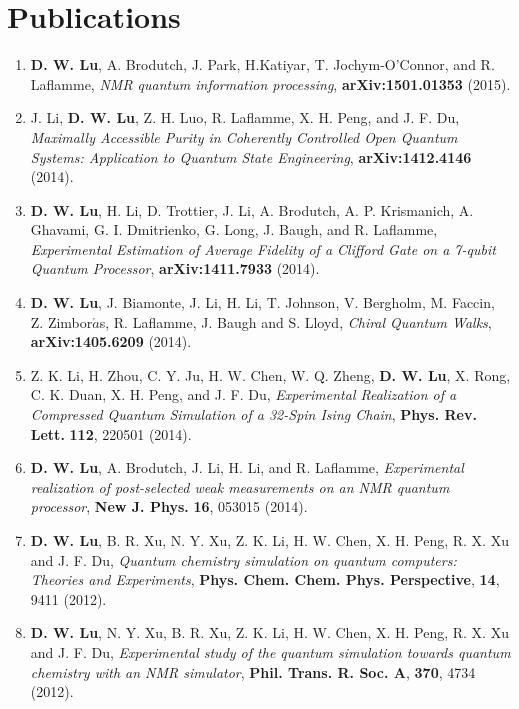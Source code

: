 \documentclass[a4paper,10pt]{article}
\begin{document}
\section{Publications}
\medskip
\begin{enumerate}
\item \textbf{D. W. Lu}, A. Brodutch, J. Park, H.Katiyar, T. Jochym-O'Connor, and R. Laflamme, {\it NMR quantum information processing},  {\bf arXiv:1501.01353} (2015).
    
\item J. Li, \textbf{D. W. Lu}, Z. H. Luo, R. Laflamme, X. H. Peng, and J. F. Du, {\it Maximally Accessible Purity in Coherently Controlled Open Quantum Systems: Application to Quantum State Engineering},  {\bf arXiv:1412.4146} (2014).

\item \textbf{D. W. Lu}, H. Li, D. Trottier, J. Li, A. Brodutch, A. P. Krismanich, A. Ghavami, G. I. Dmitrienko, G. Long, J. Baugh, and R. Laflamme, {\it Experimental Estimation of Average Fidelity of a Clifford Gate on a 7-qubit Quantum Processor},  {\bf arXiv:1411.7933} (2014).

\item \textbf{D. W. Lu}, J. Biamonte, J. Li, H. Li, T. Johnson, V. Bergholm, M. Faccin, Z. Zimbor$\acute{a}$s, R. Laflamme, J. Baugh and S. Lloyd, {\it Chiral Quantum Walks},  {\bf arXiv:1405.6209} (2014).

\item Z. K. Li, H. Zhou, C. Y. Ju, H. W. Chen, W. Q. Zheng, \textbf{D. W. Lu}, X. Rong, C. K. Duan, X. H. Peng, and J. F. Du, {\it Experimental Realization of a Compressed Quantum Simulation of a 32-Spin Ising Chain}, {\bf Phys. Rev. Lett.} \textbf{112}, 220501 (2014).

\item \textbf{D. W. Lu}, A. Brodutch, J. Li, H. Li, and R. Laflamme, {\it Experimental realization of post-selected weak measurements on an NMR quantum processor}, {\bf New J. Phys.} \textbf{16}, 053015 (2014).

\item \textbf{D. W. Lu}, B. R. Xu, N. Y. Xu, Z. K. Li, H. W. Chen, X. H. Peng, R. X. Xu and J. F. Du, {\it Quantum chemistry simulation on quantum computers: Theories
and Experiments}, {\bf Phys. Chem. Chem. Phys. Perspective}, \textbf{14}, 9411 (2012).

\item \textbf{D. W. Lu}, N. Y. Xu, B. R. Xu, Z. K. Li, H. W. Chen, X. H. Peng, R. X. Xu and J. F. Du, {\it Experimental study of the quantum
simulation towards quantum chemistry with an NMR simulator},
{\bf Phil. Trans. R. Soc. A}, \textbf{370}, 4734 (2012).


\end{enumerate}
\end{document}
